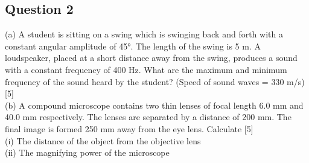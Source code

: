\documentclass{article}
\begin{document}
\subsection{Question 2}
(a) A student is sitting on a swing which is swinging back and forth with a constant angular amplitude of 45°. The length of the swing is 5 m. A loudspeaker, placed at a short distance away from the swing, produces a sound with a constant frequency of 400 Hz. What are the maximum and minimum frequency of the sound heard by the student? (Speed of sound waves = 330 m/s) [5] \\
(b) A compound microscope contains two thin lenses of focal length 6.0 mm and 40.0 mm respectively. The lenses are separated by a distance of 200 mm. The final image is formed 250 mm away from the eye lens. Calculate [5] \\
(i) The distance of the object from the objective lens \\
(ii) The magnifying power of the microscope\\
\end{document}
